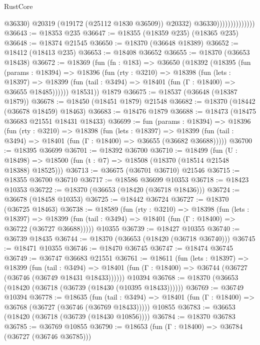 \begin{lexlean}{RustCore}
\begin{coremodule}
                                    @36330)
                                  @20319
                                  (@19172 (@25112 @1830 @36509))
                                  @20332)
                                @36330))))))))))))))
@36643 := @18353 @235
@36647 := @18355 (@18359 @235) (@18365 @235)
@36648 := @18374 @21545
@36650 := @18370 (@36648 @18389)
@36652 := @18412 (@18413 @235)
@36653 := @18408 @36652
@36655 := @18370 (@36653 @18438)
@36672 := @18369
    (fun (fn : @183) =>
    @36650
      (@18392
        (@18395
          (fun (params : @18394) =>
          @18396
            (fun (rty : @3210) =>
            @18398
              (fun (lets : @18397) =>
              @18399 (fun (tail : @3494) => @18401 (fun (Γ : @18400) => @36655 @18485))))))
        @18531))
    @1879
@36675 := @18537 (@36648 (@18387 @1879))
@36678 := @18450 (@18451 @1879) @21548
@36682 := @18370 (@18442 (@36678 @18459) @18463)
@36683 := @18476 @1879
@36688 := @18473 (@18475 @36683 @21551 @18431 @18433)
@36699 := fun (params : @18394) =>
  @18396
    (fun (rty : @3210) =>
    @18398
      (fun (lets : @18397) =>
      @18399 (fun (tail : @3494) => @18401 (fun (Γ : @18400) => @36655 (@36682 @36688)))))
@36700 := @18395 @36699
@36701 := @18392 @36700
@36710 := @18499
    (fun (U : @18498) => @18500 (fun (t : @7) => @18508 (@18370 (@18514 @21548 @18388) @18525)))
@36713 := @36675 (@36701 @36710) @21546
@36715 := @18355 @36700 @36710
@36717 := @18586 @36699 @10353
@36718 := @18423 @10353
@36722 := @18370 (@36653 (@18420 (@36718 @18436)))
@36724 := @36678 (@18458 @10353)
@36725 := @18442 @36724
@36727 := @18370 (@36725 @18463)
@36738 := @18589
    (fun (rty : @3210) =>
    @18398
      (fun (lets : @18397) =>
      @18399 (fun (tail : @3494) => @18401 (fun (Γ : @18400) => @36722 (@36727 @36688)))))
    @10355
@36739 := @18427 @10355
@36740 := @36739 @18435
@36744 := @18370 (@36653 (@18420 (@36718 @36740)))
@36745 := @18471 @10355
@36746 := @18470 @36745
@36747 := @18474 @36745
@36749 := @36747 @36683 @21551
@36761 := @18611
    (fun (lets : @18397) =>
    @18399
      (fun (tail : @3494) =>
      @18401 (fun (Γ : @18400) => @36744 (@36727 (@36746 (@36749 @18431 @18433))))))
    @10394
@36768 := @18370 (@36653 (@18420 (@36718 (@36739 (@18430 (@10395 @18433))))))
@36769 := @36749 @10394
@36778 := @18635
    (fun (tail : @3494) => @18401 (fun (Γ : @18400) => @36768 (@36727 (@36746 (@36769 @18433)))))
    @10855
@36783 := @36653 (@18420 (@36718 (@36739 (@18430 @10856))))
@36784 := @18370 @36783
@36785 := @36769 @10855
@36790 := @18653 (fun (Γ : @18400) => @36784 (@36727 (@36746 @36785)))

\end{coremodule}
\end{lexlean}
